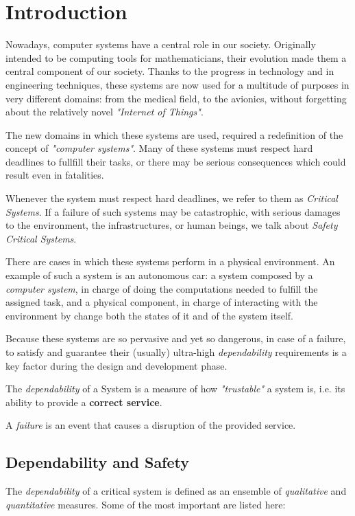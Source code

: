 \chapter{Introduction}

Nowadays, computer systems have a central role in our society. Originally intended to be computing tools for mathematicians, their evolution made them a central component of our society. Thanks to the progress in technology and in engineering techniques, these systems are now used for a multitude of purposes in very different domains: from the medical field, to the avionics, without forgetting about the relatively novel \textsl{"Internet of Things"}.

The new domains in which these systems are used, required a redefinition of the concept of \textsl{"computer systems"}. Many of these systems must respect hard deadlines to fullfill their tasks, or there may be serious consequences which could result even in fatalities.

Whenever the system must respect hard deadlines, we refer to them as \textsl{Critical Systems}. If a failure of such systems may be catastrophic, with serious damages to the environment, the infrastructures, or human beings, we talk about \textsl{Safety Critical Systems}.

There are cases in which these systems perform in a physical environment. An example of such a system is an autonomous car: a system composed by a \textsl{computer system}, in charge of doing the computations needed to fulfill the assigned task, and a physical component, in charge of interacting with the environment by change both the states of it and of the system itself.

Because these systems are so pervasive and yet so dangerous, in case of a failure, to satisfy and guarantee their (usually) ultra-high \textsl{dependability} requirements is a key factor during the design and development phase.

The \textsl{dependability} of a System is a measure of how \textsl{"trustable"} a system is, i.e. its ability to provide a \textbf{correct service}.

A \textsl{failure} is an event that causes a disruption of the provided service.

\section{Dependability and Safety}

The \textsl{dependability} of a critical system is defined as an ensemble of \textsl{qualitative} and \textsl{quantitative} measures.
Some of the most important are listed here:

